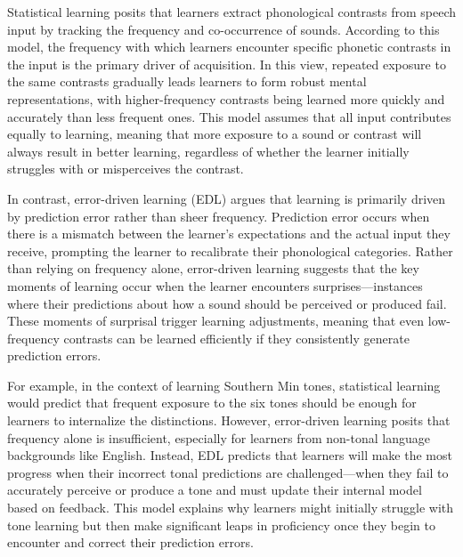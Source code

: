 Statistical learning posits that learners extract phonological contrasts from speech input by tracking the frequency and co-occurrence of sounds. According to this model, the frequency with which learners encounter specific phonetic contrasts in the input is the primary driver of acquisition. In this view, repeated exposure to the same contrasts gradually leads learners to form robust mental representations, with higher-frequency contrasts being learned more quickly and accurately than less frequent ones. This model assumes that all input contributes equally to learning, meaning that more exposure to a sound or contrast will always result in better learning, regardless of whether the learner initially struggles with or misperceives the contrast.

In contrast, error-driven learning (EDL) argues that learning is primarily driven by prediction error rather than sheer frequency. Prediction error occurs when there is a mismatch between the learner's expectations and the actual input they receive, prompting the learner to recalibrate their phonological categories. Rather than relying on frequency alone, error-driven learning suggests that the key moments of learning occur when the learner encounters surprises—instances where their predictions about how a sound should be perceived or produced fail. These moments of surprisal trigger learning adjustments, meaning that even low-frequency contrasts can be learned efficiently if they consistently generate prediction errors.

For example, in the context of learning Southern Min tones, statistical learning would predict that frequent exposure to the six tones should be enough for learners to internalize the distinctions. However, error-driven learning posits that frequency alone is insufficient, especially for learners from non-tonal language backgrounds like English. Instead, EDL predicts that learners will make the most progress when their incorrect tonal predictions are challenged—when they fail to accurately perceive or produce a tone and must update their internal model based on feedback. This model explains why learners might initially struggle with tone learning but then make significant leaps in proficiency once they begin to encounter and correct their prediction errors.


